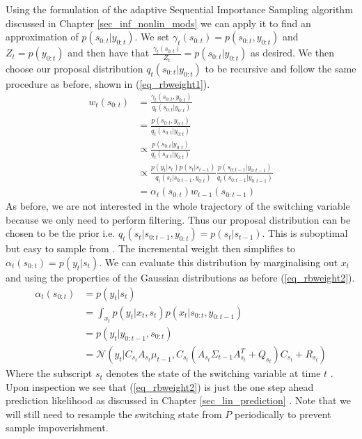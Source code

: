 Using the formulation of the adaptive Sequential Importance Sampling algorithm discussed in Chapter \ref{sec_inf_nonlin_mods} we can apply it to find an approximation of $p(s_{0:t}|y_{0:t})$. We set $\gamma_t(s_{0:t})=p(s_{0:t},y_{0:t})$ and $Z_t=p(y_{0:t})$ and then have that $\frac{\gamma_t(s_{0:t})}{Z_t} = p(s_{0:t}|y_{0:t})$ as desired. We then choose our proposal distribution $q_t(s_{0:t}|y_{0:t})$ to be recursive and follow the same procedure as before, shown in (\ref{eq_rbweight1}).
\begin{equation}
\begin{aligned}
w_t(s_{0:t}) &= \frac{\gamma_t(s_{0:t},y_{0:t})}{q_t(s_{0:t}|y_{0:t})} \\
&= \frac{p(s_{0:t},y_{0:t})}{q_t(s_{0:t}|y_{0:t})} \\
&\propto \frac{p(s_{0:t}|y_{0:t})}{q_t(s_{0:t}|y_{0:t})} \\
&\propto \frac{p(y_t|s_t)p(s_t|s_{t-1})}{q_t(s_t|s_{0:t-1},y_{0:t})}\frac{p(s_{0:t-1}|y_{0:t-1})}{q_t(s_{0:t-1}|y_{0:t-1})} \\
&= \alpha_t(s_{0:t})w_{t-1}(s_{0:t-1})
\end{aligned}
\label{eq_rbweight1}
\end{equation}
As before, we are not interested in the whole trajectory of the switching variable because we only need to perform filtering. Thus our proposal distribution can be chosen to be the prior i.e. $q_t(s_t|s_{0:t-1},y_{0:t}) = p(s_t|s_{t-1})$. This is suboptimal but easy to sample from \cite{doucet}. The incremental weight then simplifies to $\alpha_t(s_{0:t}) = p(y_t|s_t)$. We can evaluate this distribution by marginalising out $x_t$ and using the properties of the Gaussian distributions as before (\ref{eq_rbweight2}).
\begin{equation}
\begin{aligned}
\alpha_t(s_{0:t}) &= p(y_t|s_t) \\
&= \int_{x_t} p(y_t|x_t,s_t)p(x_t|s_{0:t},y_{0:t-1}) \\
&= p(y_t|y_{0:t-1}, s_{0:t}) \\
&= \mathcal{N}\left(y_t | C_{s_t}A_{s_t}\mu_{t-1}, C_{s_t}\left(A_{s_t}\Sigma_{t-1}A_{s_t}^T+Q_{s_t} \right)C_{s_t} + R_{s_t} \right)
\end{aligned}
\label{eq_rbweight2}
\end{equation} 
Where the subscript $s_t$ denotes the state of the switching variable at time $t$ \cite{murphy1}. Upon inspection we see that (\ref{eq_rbweight2}) is just the one step ahead prediction likelihood as discussed in Chapter \ref{sec_lin_prediction} \cite{murphy1}. Note that we will still need to resample the switching state from $P$ periodically to prevent sample impoverishment. 

